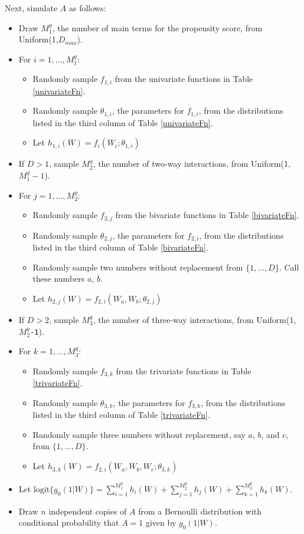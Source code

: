 \documentclass[12pt]{article}
\begin{document}
Next, simulate $A$ as follows: \begin{itemize}
\item Draw $M_{1}^g$, the number of main terms for the propensity score, from Uniform(1,$D_{max}$). 
\item For $i = 1, \dots, M_{1}^g$: \begin{itemize}
	\item Randomly sample $f_{1,i}$ from the univariate functions in Table \ref{univariateFn}. 
	\item Randomly sample $\theta_{1,i}$, the parameters for $f_{1,i}$, from the distributions listed in the third column of Table \ref{univariateFn}. 
	\item Let $h_{1,i}(W) = f_i(W_i; \theta_{1,i})$
\end{itemize}
\item If $D>1$, sample $M_{2}^g$, the number of two-way interactions, from Uniform(1,$M_{1}^g - 1$).
\item For $j = 1, \dots, M_{2}^g$: \begin{itemize}
	\item Randomly sample $f_{2,j}$ from the bivariate functions in Table \ref{bivariateFn}. 
	\item Randomly sample $\theta_{2,j}$, the parameters for $f_{2,i}$, from the distributions listed in the third column of Table \ref{bivariateFn}. 
	\item Randomly sample two numbers without replacement from $\{1,\dots,D\}$. Call these numbers $a$, $b$.
	\item Let $h_{2,j}(W) = f_{2,i}(W_a, W_b; \theta_{2,j})$
\end{itemize}
\item If $D > 2$, sample $M_3^g$, the number of three-way interactions, from Uniform(1,\texttt{$M_2^g$-1}).
\item For $k = 1, \dots, M_{3}^g$: \begin{itemize}
	\item Randomly sample $f_{3,k}$ from the trivariate functions in Table \ref{trivariateFn}. 
	\item Randomly sample $\theta_{3,k}$, the parameters for $f_{3,k}$, from the distributions listed in the third column of Table \ref{trivariateFn}. 
	\item Randomly sample three numbers without replacement, say $a$, $b$, and $c$, from $\{1,\dots,D\}$.
	\item Let $h_{3,k}(W) = f_{2,i}(W_a, W_b, W_c; \theta_{3,k})$
\end{itemize}
\item Let $\mbox{logit}\{g_0(1 | W)\} = \sum_{i=1}^{M_1^g} h_i(W) + \sum_{j=1}^{M_2^g} h_j(W) + \sum_{k=1}^{M_3^g} h_k(W)$. 
\item Draw $n$ independent copies of $A$ from a Bernoulli distribution with conditional probability that $A=1$ given by $g_0(1 | W)$. 
\end{itemize}
\end{document}
